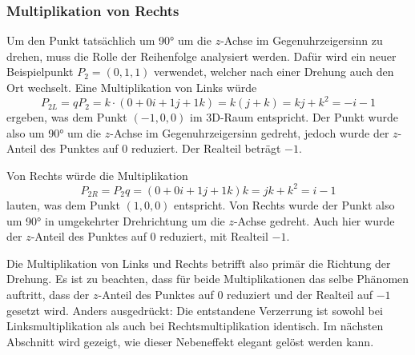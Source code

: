 \subsubsection{Multiplikation von Rechts}

Um den Punkt tatsächlich um 90° um die $z$-Achse im 
Gegenuhrzeigersinn zu drehen, muss die Rolle der Reihenfolge 
analysiert werden. Dafür wird ein neuer Beispielpunkt $P_2 = (0,1,1)
$ verwendet, welcher nach einer Drehung auch den Ort wechselt. Eine 
Multiplikation von Links würde
\begin{equation*}
    P_{2L} = q P_2 
    = k \cdot (0 + 0i + 1\!j + 1k) 
    = k (j + k) 
    = k\!j + k^2 
    = -i - 1
\end{equation*}
ergeben, was dem Punkt $(-1,0,0)$ im 3D-Raum entspricht. Der 
Punkt wurde also um 90° um die $z$-Achse im Gegenuhrzeigersinn 
gedreht, jedoch wurde der $z$-Anteil des Punktes auf 0 reduziert. 
Der Realteil beträgt $-1$.

Von Rechts würde die Multiplikation
\begin{equation*}
    P_{2R} 
    = P_2 q 
    = (0 + 0i + 1\!j + 1k) k 
    = jk + k^2 
    = i - 1
\end{equation*}
lauten, was dem Punkt $(1,0,0)$ entspricht. Von Rechts wurde 
der Punkt also um 90° in umgekehrter Drehrichtung um die $z$-Achse 
gedreht. Auch hier wurde der $z$-Anteil des Punktes auf 0 
reduziert, mit Realteil $-1$.

Die Multiplikation von Links und Rechts betrifft also primär die 
Richtung der Drehung. Es ist zu beachten, dass für beide 
Multiplikationen das selbe Phänomen auftritt, dass der $z$-Anteil 
des Punktes auf 0 reduziert und der Realteil auf $-1$ gesetzt wird. 
Anders ausgedrückt: Die entstandene Verzerrung ist sowohl bei 
Linksmultiplikation als auch bei Rechtsmultiplikation identisch. 
Im nächsten Abschnitt wird gezeigt, wie dieser Nebeneffekt elegant 
gelöst werden kann.
